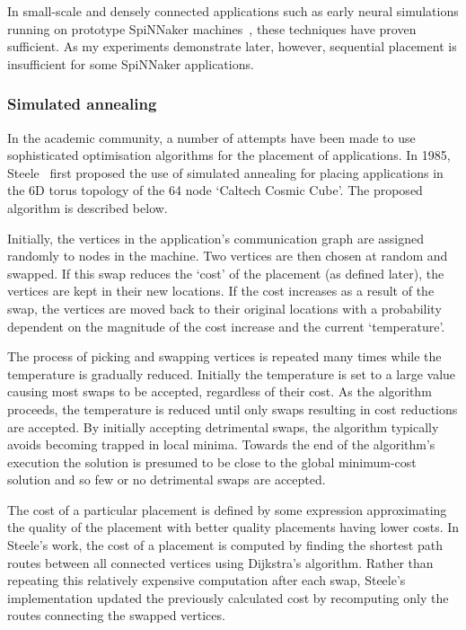 				In small-scale and densely connected applications such as early neural
				simulations running on prototype SpiNNaker machines~\cite{galluppi10},
				these techniques have proven sufficient.  As my experiments demonstrate
				later, however, sequential placement is insufficient for some SpiNNaker
				applications.
				
			\subsubsection{Simulated annealing}
				
				\label{sec:application-placement-summary}
				
				In the academic community, a number of attempts have been made to use
				sophisticated optimisation algorithms for the placement of
				applications. In 1985, Steele~\cite{steele85} first proposed the use of
				simulated annealing for placing applications in the 6D torus topology
				of the 64 node `Caltech Cosmic Cube'. The proposed algorithm is
				described below.
				
				Initially, the vertices in the application's communication graph are
				assigned randomly to nodes in the machine. Two vertices are then chosen
				at random and swapped.  If this swap reduces the `cost' of the
				placement (as defined later), the vertices are kept in their new
				locations. If the cost increases as a result of the swap, the vertices
				are moved back to their original locations with a probability dependent
				on the magnitude of the cost increase and the current `temperature'.
				
				The process of picking and swapping vertices is repeated many times
				while the temperature is gradually reduced. Initially the temperature
				is set to a large value causing most swaps to be accepted, regardless
				of their cost. As the algorithm proceeds, the temperature is reduced
				until only swaps resulting in cost reductions are accepted. By
				initially accepting detrimental swaps, the algorithm typically avoids
				becoming trapped in local minima. Towards the end of the algorithm's
				execution the solution is presumed to be close to the global
				minimum-cost solution and so few or no detrimental swaps are accepted.
				
				The cost of a particular placement is defined by some expression
				approximating the quality of the placement with better quality
				placements having lower costs. In Steele's work, the cost of a
				placement is computed by finding the shortest path routes between all
				connected vertices using Dijkstra's algorithm. Rather than repeating
				this relatively expensive computation after each swap, Steele's
				implementation updated the previously calculated cost by recomputing
				only the routes connecting the swapped vertices.
				
